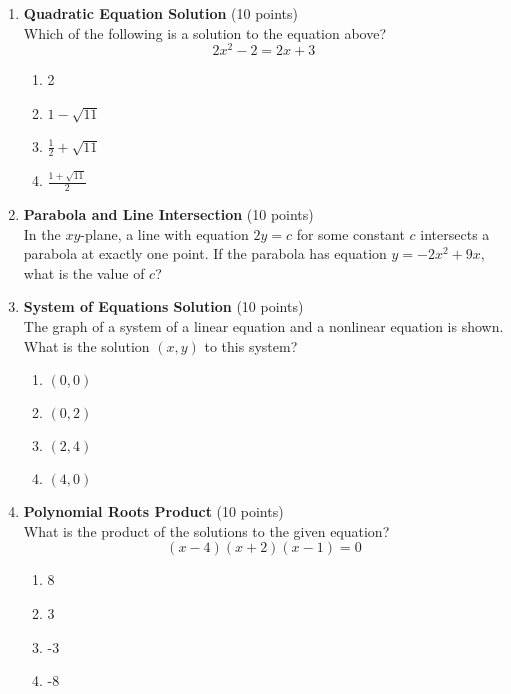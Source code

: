 \begin{enumerate}
  \item \textbf{Quadratic Equation Solution} (10 points)\\
  Which of the following is a solution to the equation above?
  \[
  2 x^{2}-2=2 x+3
  \]
  \begin{enumerate}[label=(\Alph*)]
    \item 2
    \item $1-\sqrt{11}$
    \item $\frac{1}{2}+\sqrt{11}$
    \item $\frac{1+\sqrt{11}}{2}$
  \end{enumerate}
  \begin{subanswer}
  \end{subanswer}

  \item \textbf{Parabola and Line Intersection} (10 points)\\
  In the $xy$-plane, a line with equation $2 y=c$ for some constant $c$ intersects a parabola at exactly one point. If the parabola has equation $y=-2 x^{2}+9 x$, what is the value of $c$?
  \begin{subanswer}
  \end{subanswer}

  \newpage

  
  \item \textbf{System of Equations Solution} (10 points)\\
  The graph of a system of a linear equation and a nonlinear equation is shown. What is the solution $(x, y)$ to this system?
  \begin{enumerate}[label=(\Alph*)]
    \item $(0,0)$
    \item $(0,2)$
    \item $(2,4)$
    \item $(4,0)$
  \end{enumerate}
  \begin{subanswer}
  \end{subanswer}

  \item \textbf{Polynomial Roots Product} (10 points)\\
  What is the product of the solutions to the given equation?
  \[
  (x-4)(x+2)(x-1)=0
  \]
  \begin{enumerate}[label=(\Alph*)]
    \item 8
    \item 3
    \item -3
    \item -8
  \end{enumerate}
  \begin{subanswer}
  \end{subanswer}


\end{enumerate}

